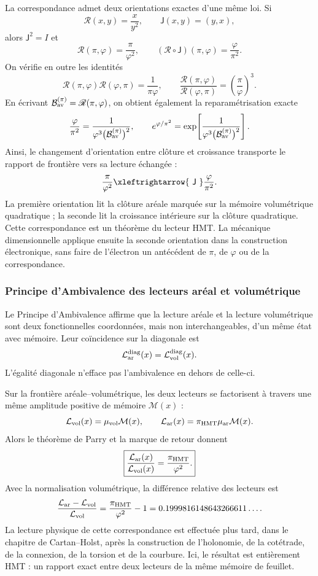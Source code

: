 La correspondance admet deux orientations exactes d'une même loi. Si
\[
 \mathscr R(x,y)=\frac{x}{y^2},
 \qquad
 \mathsf J(x,y)=(y,x),
\]
alors \(\mathsf J^2=I\) et
\[
 \mathscr R(\pi,\varphi)=\frac{\pi}{\varphi^2},
 \qquad
 (\mathscr R\circ\mathsf J)(\pi,\varphi)
 =\frac{\varphi}{\pi^2}.
\]
On vérifie en outre les identités
\[
 \mathscr R(\pi,\varphi)\mathscr R(\varphi,\pi)
 =\frac1{\pi\varphi},
 \qquad
 \frac{\mathscr R(\pi,\varphi)}
 {\mathscr R(\varphi,\pi)}
 =\left(\frac{\pi}{\varphi}\right)^3.
\]
En écrivant
\(\mathcal B_{\rm av}^{(\pi)}=\mathscr R(\pi,\varphi)\), on obtient
également la reparamétrisation exacte
\[
 \frac{\varphi}{\pi^2}
 =
 \frac1{\varphi^3
 \bigl(\mathcal B_{\rm av}^{(\pi)}\bigr)^2},
 \qquad
 e^{\varphi/\pi^2}
 =
 \exp\!\left[
 \frac1{\varphi^3
 \bigl(\mathcal B_{\rm av}^{(\pi)}\bigr)^2}
 \right].
\]
Ainsi, le changement d'orientation entre clôture et croissance transporte le
rapport de frontière vers sa lecture échangée :
\[
 \frac{\pi}{\varphi^2}
 \xleftrightarrow{\ \mathsf J\ }
 \frac{\varphi}{\pi^2}.
\]
La première orientation lit la clôture aréale marquée sur la mémoire
volumétrique quadratique ; la seconde lit la croissance intérieure sur la
clôture quadratique. Cette correspondance est un théorème du lecteur HMT. La
mécanique dimensionnelle applique ensuite la seconde orientation dans la
construction électronique, sans faire de l'électron un antécédent de
\(\pi\), de \(\varphi\) ou de la correspondance.

\subsubsection{Principe d'Ambivalence des lecteurs aréal et volumétrique}
\label{p12-83-c16-s2:sec:ambivalencia-grav-inercial-pi-phi2}

Le Principe d'Ambivalence affirme que la lecture aréale et la lecture
volumétrique sont deux fonctionnelles coordonnées, mais non interchangeables, d'un
même état avec mémoire. Leur coïncidence sur la diagonale est
\[
 \mathcal L_{\rm ar}^{\rm diag}(x)
 =\mathcal L_{\rm vol}^{\rm diag}(x).
\]
L'égalité diagonale n'efface pas l'ambivalence en dehors de celle-ci.

Sur la frontière aréale--volumétrique, les deux lecteurs se factorisent à travers
une même amplitude positive de mémoire \(\mathcal M(x)\) :
\[
 \mathcal L_{\rm vol}(x)=\mu_{\rm vol}\mathcal M(x),
 \qquad
 \mathcal L_{\rm ar}(x)=
 \pi_{\rm HMT}\mu_{\rm ar}\mathcal M(x).
\]
Alors le théorème de Parry et la marque de retour donnent
\[
 \boxed{\displaystyle
 \frac{\mathcal L_{\rm ar}(x)}
 {\mathcal L_{\rm vol}(x)}
 =\frac{\pi_{\rm HMT}}{\varphi^2}.}
\]
Avec la normalisation volumétrique, la différence relative des lecteurs est
\[
 \frac{\mathcal L_{\rm ar}-\mathcal L_{\rm vol}}
 {\mathcal L_{\rm vol}}
 =
 \frac{\pi_{\rm HMT}}{\varphi^2}-1
 =
 0.1999816148643266611\ldots.
\]
La lecture physique de cette correspondance est effectuée plus tard, dans le chapitre de
Cartan--Holst, après la construction de l'holonomie, de la cotétrade, de la connexion, de la torsion
et de la courbure. Ici, le résultat est entièrement HMT : un rapport exact entre
deux lecteurs de la même mémoire de feuillet.

